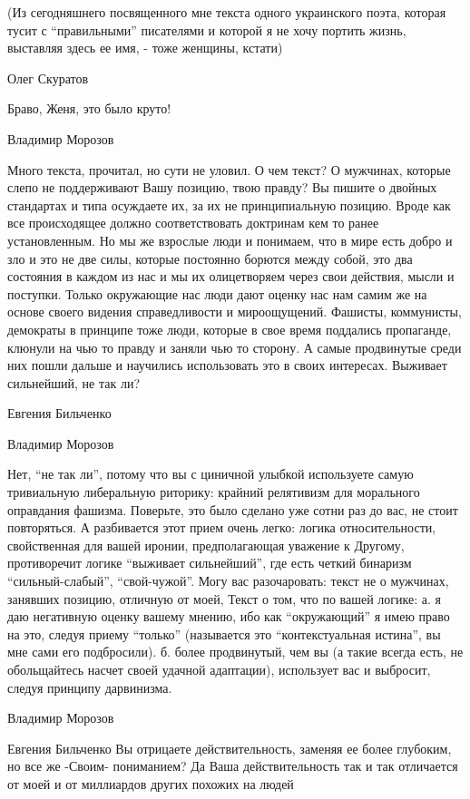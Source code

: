 (Из сегодняшнего посвященного мне текста одного украинского поэта, которая
тусит с \enquote{правильными} писателями и которой я не хочу портить жизнь, выставляя
здесь ее имя, - тоже женщины, кстати)

Олег Скуратов

Браво, Женя, это было круто!

Владимир Морозов

Много текста, прочитал, но сути не уловил. О чем текст? О мужчинах, которые
слепо не поддерживают Вашу позицию, твою правду? Вы пишите о двойных стандартах
и типа осуждаете их, за их не принципиальную позицию. Вроде как все
происходящее должно соответствовать доктринам кем то ранее установленным. Но мы
же взрослые люди и понимаем, что в мире есть добро и зло и это не две силы,
которые постоянно борются между собой, это два состояния в каждом из нас и мы
их олицетворяем через свои действия, мысли и поступки. Только окружающие нас
люди дают оценку нас нам самим же на основе своего видения справедливости и
мироощущений. Фашисты, коммунисты, демократы в принципе тоже люди, которые в
свое время поддались пропаганде, клюнули на чью то правду и заняли чью то
сторону. А самые продвинутые среди них пошли дальше и научились использовать
это в своих интересах. Выживает сильнейший, не так ли?

Евгения Бильченко

Владимир Морозов 

Нет, \enquote{не так ли}, потому что вы с циничной улыбкой используете самую
тривиальную либеральную риторику: крайний релятивизм для морального оправдания
фашизма. Поверьте, это было сделано уже сотни раз до вас, не стоит повторяться.
А разбивается этот прием очень легко: логика относительности, свойственная для
вашей иронии, предполагающая уважение к Другому, противоречит логике
\enquote{выживает сильнейший}, где есть четкий бинаризм
\enquote{сильный-слабый}, \enquote{свой-чужой}. Могу вас разочаровать: текст не
о мужчинах, занявших позицию, отличную от моей, Текст о том, что по вашей
логике: а. я даю негативную оценку вашему мнению, ибо как \enquote{окружающий}
я имею право на это, следуя приему \enquote{только} (называется это
\enquote{контекстуальная истина}, вы мне сами его подбросили).  б. более
продвинутый, чем вы (а такие всегда есть, не обольщайтесь насчет своей удачной
адаптации), использует вас и выбросит, следуя принципу дарвинизма.

Владимир Морозов

Евгения Бильченко Вы отрицаете действительность, заменяя ее более глубоким, но
все же -Своим- пониманием? Да Ваша действительность так и так отличается от
моей и от миллиардов других похожих на людей

